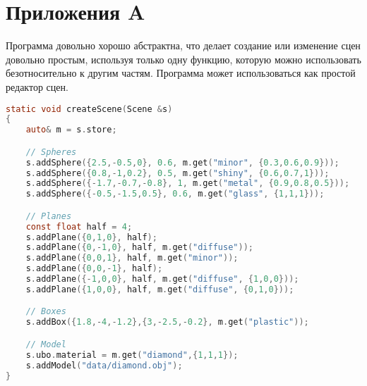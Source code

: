 \chapter*{Приложения A}
\label{cha:appendix1}

Программа довольно хорошо абстрактна, что делает создание или изменение сцен довольно простым,
используя только одну функцию, которую можно использовать безотносительно к другим частям.
Программа может использоваться как простой редактор сцен.\\

\begin{lstlisting}[language=C]
static void createScene(Scene &s)
{
    auto& m = s.store;

    // Spheres
    s.addSphere({2.5,-0.5,0}, 0.6, m.get("minor", {0.3,0.6,0.9}));
    s.addSphere({0.8,-1,0.2}, 0.5, m.get("shiny", {0.6,0.7,1}));
    s.addSphere({-1.7,-0.7,-0.8}, 1, m.get("metal", {0.9,0.8,0.5}));
    s.addSphere({-0.5,-1.5,0.5}, 0.6, m.get("glass", {1,1,1}));

    // Planes
    const float half = 4;
    s.addPlane({0,1,0}, half);
    s.addPlane({0,-1,0}, half, m.get("diffuse"));
    s.addPlane({0,0,1}, half, m.get("minor"));
    s.addPlane({0,0,-1}, half);
    s.addPlane({-1,0,0}, half, m.get("diffuse", {1,0,0}));
    s.addPlane({1,0,0}, half, m.get("diffuse", {0,1,0}));

    // Boxes
    s.addBox({1.8,-4,-1.2},{3,-2.5,-0.2}, m.get("plastic"));

    // Model
    s.ubo.material = m.get("diamond",{1,1,1});
    s.addModel("data/diamond.obj");
}
\end{lstlisting}
